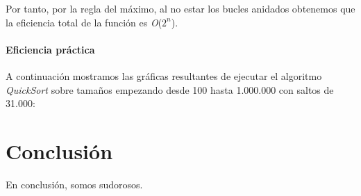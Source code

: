 \documentclass[a4paper,12pt]{article} %
\begin{document}
Por tanto, por la regla del máximo, al no estar los bucles anidados obtenemos que la eficiencia total de la función es \textit{O}($2^n$).\\

\paragraph{Eficiencia práctica}

A continuación mostramos las gráficas resultantes de ejecutar el algoritmo \textit{QuickSort} 
sobre tamaños empezando desde 100 hasta 1.000.000 con saltos de 31.000:

\section{Conclusión}
En conclusión, somos sudorosos.
\end{document}
